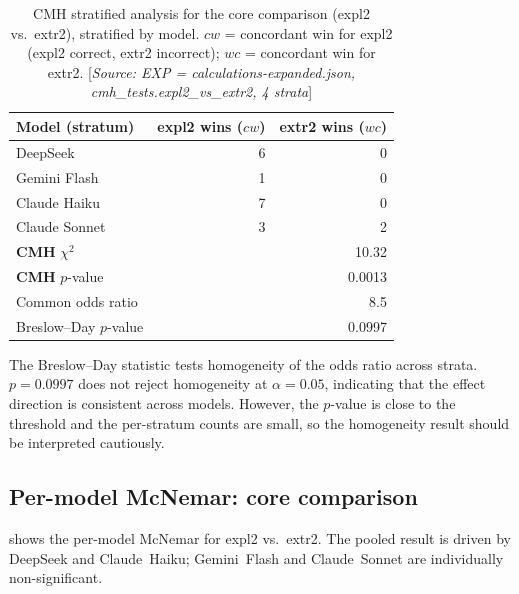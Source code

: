 \documentclass[11pt,a4paper]{article}
\begin{document}
\begin{table}[htbp]
\centering
\caption{CMH stratified analysis for the core comparison
  (\textsf{expl2} vs.\ \textsf{extr2}), stratified by model.
  $cw$ = concordant win for \textsf{expl2} (expl2 correct,
  extr2 incorrect); $wc$ = concordant win for \textsf{extr2}.
  [\emph{Source: EXP = calculations-expanded.json,
  cmh\_tests.expl2\_vs\_extr2, 4 strata}]}
\label{tab:cmh}
\smallskip
\begin{tabular}{@{}lrr@{}}
\toprule
Model (stratum) & \textsf{expl2} wins ($cw$) & \textsf{extr2} wins ($wc$) \\
\midrule
DeepSeek       & 6 & 0 \\
Gemini Flash   & 1 & 0 \\
Claude Haiku   & 7 & 0 \\
Claude Sonnet  & 3 & 2 \\
\midrule
\textbf{CMH} $\chi^2$        & \multicolumn{2}{r}{10.32} \\
\textbf{CMH} $p$-value       & \multicolumn{2}{r}{0.0013} \\
Common odds ratio             & \multicolumn{2}{r}{8.5} \\
Breslow--Day $p$-value        & \multicolumn{2}{r}{0.0997} \\
\bottomrule
\end{tabular}
\end{table}

\noindent The Breslow--Day statistic tests homogeneity of the odds ratio
across strata.  $p = 0.0997$ does not reject homogeneity at $\alpha = 0.05$,
indicating that the effect direction is consistent across models.  However,
the $p$-value is close to the threshold and the per-stratum counts are small,
so the homogeneity result should be interpreted cautiously.

\subsection{Per-model McNemar: core comparison}

 shows the per-model McNemar for \textsf{expl2} vs.\
\textsf{extr2}.  The pooled result is driven by DeepSeek and Claude~Haiku;
Gemini~Flash and Claude~Sonnet are individually non-significant.
\end{document}
